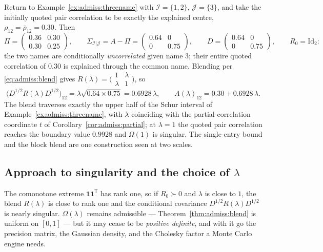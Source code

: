 \begin{example}
\label{ex:admiss:blendtraverse}
Return to Example~\ref{ex:admiss:threename} with $\mathcal I = \{1, 2\}$,
$\mathcal J = \{3\}$, and take the initially quoted pair correlation to be
exactly the explained centre, $\rho_{12} = \bar\rho_{12} = 0.30$. Then
\[
  \Pi = \begin{pmatrix} 0.36 & 0.30 \\ 0.30 & 0.25 \end{pmatrix},
  \qquad
  \Sigma_{\mathcal I|\mathcal J}
  = A - \Pi
  = \begin{pmatrix} 0.64 & 0 \\ 0 & 0.75 \end{pmatrix},
  \qquad
  D = \begin{pmatrix} 0.64 & 0 \\ 0 & 0.75 \end{pmatrix},
  \qquad
  R_0 = \mathrm{Id}_2 :
\]
the two names are conditionally \emph{uncorrelated} given name 3; their
entire quoted correlation of $0.30$ is explained through the common name.
Blending per \eqref{eq:admiss:blend} gives
$R(\lambda) = \bigl(\begin{smallmatrix} 1 & \lambda \\ \lambda & 1
\end{smallmatrix}\bigr)$, so
\[
  \bigl(D^{1/2} R(\lambda) D^{1/2}\bigr)_{12}
  = \lambda \sqrt{0.64 \times 0.75} = 0.6928\,\lambda,
  \qquad
  A(\lambda)_{12} = 0.30 + 0.6928\,\lambda .
\]
The blend traverses exactly the upper half of the Schur interval of
Example~\ref{ex:admiss:threename}, with $\lambda$ coinciding with the
partial-correlation coordinate $t$ of
Corollary~\ref{cor:admiss:partial}; at $\lambda = 1$ the quoted pair
correlation reaches the boundary value $0.9928$ and $\Omega(1)$ is
singular. The single-entry bound and the block blend are one construction
seen at two scales.
\end{example}

\subsection{Approach to singularity and the choice of $\lambda$}
\label{sec:admiss:singularity}

The comonotone extreme $\mathbf{1}\mathbf{1}^{\mathsf T}$ has rank one, so
if $R_0 \succ 0$ and $\lambda$ is close to $1$, the blend $R(\lambda)$ is
close to rank one and the conditional covariance
$D^{1/2} R(\lambda) D^{1/2}$ is nearly singular. $\Omega(\lambda)$ remains
admissible --- Theorem~\ref{thm:admiss:blend} is uniform on $[0,1]$ --- but
it may cease to be \emph{positive definite}, and with it go the precision
matrix, the Gaussian density, and the Cholesky factor a Monte Carlo engine
needs.

